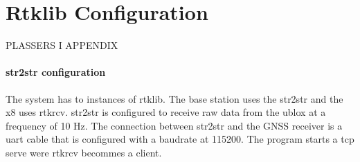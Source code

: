 \chapter{Rtklib Configuration}

PLASSERS I APPENDIX
\subsubsection{str2str configuration}
The system has to instances of rtklib. The base station uses the str2str and the x8 uses rtkrcv. str2str is configured to receive raw data from the ublox at a frequency of 10 Hz. The connection between str2str and the GNSS receiver is a uart cable that is configured with a baudrate at 115200. The program starts a tcp serve were rtkrcv becommes a client.
